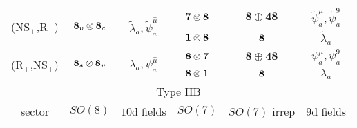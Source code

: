 {\begin{tabular}{|cccccc|}
    \multicolumn{1}{|c|}{\multirow{2}{*}{(NS$_+$,R$_-$)}}  & \multicolumn{1}{c|}{\multirow{2}{*}{$\boldsymbol{8_v} \otimes \boldsymbol{8_c}$}} & \multicolumn{1}{c|}{\multirow{2}{*}{$\tilde{\lambda}_a, \tilde{\psi}^{\hat{\mu}}_a$}}                 & \multicolumn{1}{c|}{$\boldsymbol{7} \otimes \boldsymbol{8}$}                          & \multicolumn{1}{c|}{$\boldsymbol{8} \oplus\boldsymbol{48}$}                           & $\tilde{\psi}^\mu_a, \tilde{\psi}^9_a$     \\ \cline{4-6} 
    \multicolumn{1}{|c|}{}                                 & \multicolumn{1}{c|}{}                                 & \multicolumn{1}{c|}{}                                                                                 & \multicolumn{1}{c|}{$\boldsymbol{1} \otimes \boldsymbol{8}$}                              & \multicolumn{1}{c|}{$\boldsymbol{8}$}                                                         & $\tilde{\lambda}_a$                        \\ \hline
    \multicolumn{1}{|c|}{\multirow{2}{*}{(R$_+$,NS$_+$)}}  & \multicolumn{1}{c|}{\multirow{2}{*}{$\boldsymbol{8_s}\otimes\boldsymbol{8_v}$}}   & \multicolumn{1}{c|}{\multirow{2}{*}{${\lambda}_a, {\psi}^{\hat{\mu}}_a$}}                             & \multicolumn{1}{c|}{$\boldsymbol{8}\otimes\boldsymbol{7}$}                            & \multicolumn{1}{c|}{$\boldsymbol{8} \oplus\boldsymbol{48}$}                           & $\psi^\mu_a, \psi^9_a$                     \\ \cline{4-6} 
    \multicolumn{1}{|c|}{}                                 & \multicolumn{1}{c|}{}                                 & \multicolumn{1}{c|}{}                                                                                 & \multicolumn{1}{c|}{$\boldsymbol{8} \otimes \boldsymbol{1}$}                              & \multicolumn{1}{c|}{$\boldsymbol{8}$}                                                         & $\lambda_a$                                \\ \hline
    \multicolumn{6}{|c|}{Type IIB}                                                                                                                                                                                                                                                                                                                                                                                                      \\ \hline
    \multicolumn{1}{|c|}{sector}                           & \multicolumn{1}{c|}{$SO(8)$}                          & \multicolumn{1}{c|}{$10$d fields}                                                                     & \multicolumn{1}{c|}{$SO(7)$}                                          & \multicolumn{1}{c|}{$SO(7)$ irrep}                                                    & $9$d fields                                \\ \hline

\end{tabular}}
